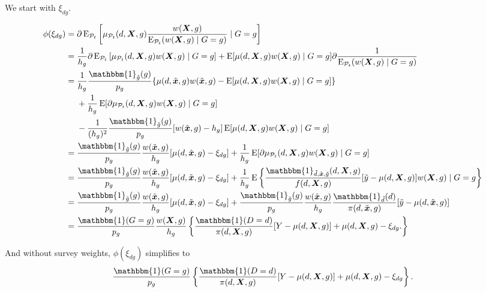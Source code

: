 \documentclass[12pt,a4paper]{article}
\newcommand{\E}{\operatorname{E}}
\def\X{{\boldsymbol X}}
\def\x{{\boldsymbol x}}
\def\one{\mathbbm{1}}
\begin{document}
We start with $\xi_{dg}$.

\begin{align*}
    \phi(\xi_{dg}) &= \partial \E_{\mathcal{P}_t} \left[\mu_{\mathcal{P}_t}(d,\X,g) \frac{w(\X,g)}{\E_{\mathcal{P}_t}(w(\X,g) \mid G=g)}  \mid G=g \right] \\
    &= \frac{1}{h_g} \partial \E_{\mathcal{P}_t} \left[\mu_{\mathcal{P}_t}(d,\X,g) w(\X,g)  \mid G=g \right] +  \E[\mu(d,\X,g)w(\X,g) \mid G=g] \partial \frac{1}{\E_{\mathcal{P}_t}(w(\X,g)\mid G=g)} \\
    &= \frac{1}{h_g}\frac{\one_{\Tilde{g}}(g)}{p_g}  \{\mu(d,\Tilde{\x},g)w(\Tilde{\x},g) -\E[\mu(d,\X,g)w(\X,g) \mid G=g]\}  \\
    &\phantom{{}={}} + \frac{1}{h_g} \E[\partial  \mu_{\mathcal{P}_t}(d,\X,g)w(\X,g) \mid G=g ]  \\ 
    &\phantom{{}={}} - \frac{1}{(h_g)^2}\frac{\one_{\Tilde{g}}(g)}{p_g}[w(\Tilde{\x},g)-h_g]\E[\mu(d,\X,g)w(\X,g) \mid G=g] \\
    &= \frac{\one_{\Tilde{g}}(g)}{p_g}  \frac{w(\Tilde{\x},g)}{h_g} [\mu(d,\Tilde{\x},g)-\xi_{dg}] + \frac{1}{h_g} \E[\partial  \mu_{\mathcal{P}_t}(d,\X,g)w(\X,g) \mid G=g ] \\
    &= \frac{\one_{\Tilde{g}}(g)}{p_g}  \frac{w(\Tilde{\x},g)}{h_g} [\mu(d,\Tilde{\x},g)-\xi_{dg}] + \frac{1}{h_g} \E \left\{ \frac{\one_{\Tilde{d},\Tilde{\x},\Tilde{g}}(d,\X,g)}{f(d,\X,g)} [\Tilde{y}-\mu(d,\X,g)] w(\X,g) \mid G=g \right\} \\
        &= \frac{\one_{\Tilde{g}}(g)}{p_g}  \frac{w(\Tilde{\x},g)}{h_g} [\mu(d,\Tilde{\x},g)-\xi_{dg}] + \frac{\one_{\Tilde{g}}(g)}{p_g} \frac{w(\Tilde{\x},g)}{h_g} \frac{\one_{\Tilde{d}}(d)}{\pi(d, \Tilde{\x},g)} [\Tilde{y}-\mu(d,\Tilde{\x},g)] \\
    &= \frac{\one(G=g)}{p_g}\frac{w(\X,g)}{h_g}\left\{ \frac{\one(D=d)}{\pi(d, \X,g)} [Y-\mu(d,\X,g)] + \mu(d,\X,g) - \xi_{dg}. \right\}
\end{align*}

And without survey weights, $\phi(\xi_{dg})$ simplifies to
$$\frac{\one(G=g)}{p_g} \left\{ \frac{\one(D=d)}{\pi(d, \X,g)} [Y-\mu(d,\X,g)] + \mu(d,\X,g) - \xi_{dg} \right\}.$$
\end{document}
